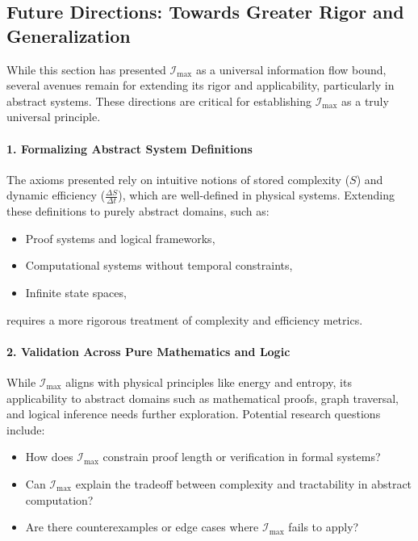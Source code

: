 \documentclass[12pt]{article}
\begin{document}
\subsection{Future Directions: Towards Greater Rigor and Generalization}

While this section has presented \(\mathcal{I}_{\text{max}}\) as a universal information flow bound, several avenues remain for extending its rigor and applicability, particularly in abstract systems. These directions are critical for establishing \(\mathcal{I}_{\text{max}}\) as a truly universal principle.

\paragraph{1. Formalizing Abstract System Definitions}
The axioms presented rely on intuitive notions of stored complexity (\(S\)) and dynamic efficiency (\(\frac{\Delta S}{\Delta t}\)), which are well-defined in physical systems. Extending these definitions to purely abstract domains, such as:
\begin{itemize}
    \item Proof systems and logical frameworks,
    \item Computational systems without temporal constraints,
    \item Infinite state spaces,
\end{itemize}
requires a more rigorous treatment of complexity and efficiency metrics.

\paragraph{2. Validation Across Pure Mathematics and Logic}
While \(\mathcal{I}_{\text{max}}\) aligns with physical principles like energy and entropy, its applicability to abstract domains such as mathematical proofs, graph traversal, and logical inference needs further exploration. Potential research questions include:
\begin{itemize}
    \item How does \(\mathcal{I}_{\text{max}}\) constrain proof length or verification in formal systems?
    \item Can \(\mathcal{I}_{\text{max}}\) explain the tradeoff between complexity and tractability in abstract computation?
    \item Are there counterexamples or edge cases where \(\mathcal{I}_{\text{max}}\) fails to apply?
\end{itemize}
\end{document}

